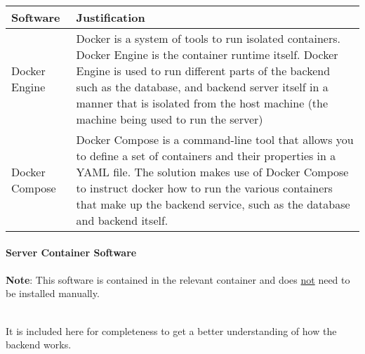 \documentclass[../../../main.tex]{subfiles}
\begin{document}
\begin{tabular}{ |p{}|p{}| }
    \hline
    \textbf{Software} & \textbf{Justification}                                                                                                                                                                \\
    \hline
    Docker Engine     & Docker is a system of tools to run isolated containers.\newline
    Docker Engine is the container runtime itself.\newline
    Docker Engine is used to run different parts of the backend such as the database, and backend server itself in a manner that is isolated from the host machine (the machine being used to run the server) \\
    \hline
    Docker Compose    & Docker Compose is a command-line tool that allows you to define a set of containers and their properties in a YAML file.\newline
    The solution makes use of Docker Compose to instruct docker how to run the various containers that make up the backend service, such as the database and backend itself.                                  \\
    \hline
\end{tabular}

\pagebreak

\paragraph{Server Container Software}

\paragraph{} %

\noindent \textbf{Note}: This software is contained in the relevant container and does \underline{not} need to be installed manually.

\noindent \\ It is included here for completeness to get a better understanding of how the backend works.\\
\end{document}
